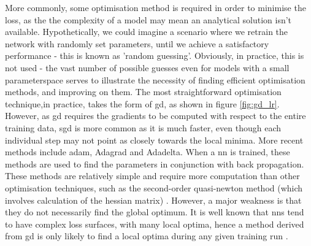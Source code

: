 More commonly, some optimisation method is required in order to minimise the \gls{loss}, as the the complexity of a model may mean an analytical solution isn't available. Hypothetically, we could imagine a scenario where we retrain the network with randomly set parameters, until we achieve a satisfactory performance - this is known as 'random guessing'. Obviously, in practice, this is not used - the vast number of possible guesses even for models with a small \gls{parameterspace} serves to illustrate the necessity of finding efficient optimisation methods, and improving on them. The most straightforward optimisation technique,in practice, takes the form of \gls{gd}, as shown in figure \ref{fig:gd_lr}. However, as \gls{gd} requires the gradients to be computed with respect to the entire training data, \gls{sgd} is more common as it is much faster, even though each individual step may not point as closely towards the local minima. More recent methods include  \gls{adam}, Adagrad and Adadelta. When a \gls{nn} is trained, these methods are used to find the parameters in conjunction with back propagation. These methods are relatively simple and require more computation than other optimisation techniques, such as the second-order quasi-newton method (which involves calculation of the hessian matrix) \cite[p.~34]{nn_tricks_trade}. However, a major weakness is that they do not necessarily find the global optimum. It is well known that \gls{nn}s tend to have complex loss surfaces, with many local optima, hence a method derived from \gls{gd} is only likely to find a local optima during any given training run \cite[pg.~83]{good_fellow_2016}.   

